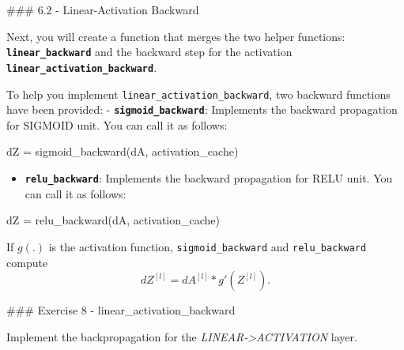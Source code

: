 \documentclass[11pt]{article}
\providecommand{\tightlist}{%
      \setlength{\itemsep}{0pt}\setlength{\parskip}{0pt}}
\newenvironment{Shaded}{}{}
\newcommand{\NormalTok}[1]{{#1}}
\newcommand{\OperatorTok}[1]{\textcolor[rgb]{0.40,0.40,0.40}{{#1}}}
\begin{document}
    \#\#\# 6.2 - Linear-Activation Backward

Next, you will create a function that merges the two helper functions:
\textbf{\texttt{linear\_backward}} and the backward step for the
activation \textbf{\texttt{linear\_activation\_backward}}.

To help you implement \texttt{linear\_activation\_backward}, two
backward functions have been provided: -
\textbf{\texttt{sigmoid\_backward}}: Implements the backward propagation
for SIGMOID unit. You can call it as follows:

\begin{Shaded}
\begin{Highlighting}[]
\NormalTok{dZ }\OperatorTok{=}\NormalTok{ sigmoid\_backward(dA, activation\_cache)}
\end{Highlighting}
\end{Shaded}

\begin{itemize}
\tightlist
\item
  \textbf{\texttt{relu\_backward}}: Implements the backward propagation
  for RELU unit. You can call it as follows:
\end{itemize}

\begin{Shaded}
\begin{Highlighting}[]
\NormalTok{dZ }\OperatorTok{=}\NormalTok{ relu\_backward(dA, activation\_cache)}
\end{Highlighting}
\end{Shaded}

If \(g(.)\) is the activation function, \texttt{sigmoid\_backward} and
\texttt{relu\_backward} compute
\[dZ^{[l]} = dA^{[l]} * g'(Z^{[l]}). \tag{11}\]

\#\#\# Exercise 8 - linear\_activation\_backward

Implement the backpropagation for the
\emph{LINEAR-\textgreater ACTIVATION} layer.
\end{document}
